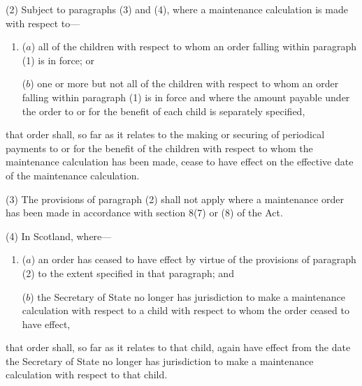 \documentclass[12pt,a4paper]{article}
\begin{document}
(2) Subject to paragraphs (3) and (4), where a maintenance 
calculation
is made with respect to—
\begin{enumerate}\item[]
($a$) all of the children with respect to whom an order falling within paragraph (1) is in force; or

($b$) one or more but not all of the children with respect to whom an order falling within paragraph (1) is in force and where the amount payable under the order to or for the benefit of each child is separately specified,
\end{enumerate}
that order shall, so far as it relates to the making or securing of periodical payments to or for the benefit of the children with respect to whom the maintenance 
calculation 
has been made, cease to have effect
on the effective date of the maintenance calculation.  %

(3) The provisions of paragraph (2) shall not apply where a maintenance order has been made in accordance with section 8(7) or (8) of the Act.

(4) In Scotland, where—
\begin{enumerate}\item[]
($a$) an order has ceased to have effect by virtue of the provisions of paragraph (2) to the extent specified in that paragraph; and

($b$) 
the Secretary of State  %
no longer has jurisdiction to make a maintenance 
calculation
with respect to a child with respect to whom the order ceased to have effect,
\end{enumerate}
that order shall, so far as it relates to that child, again have effect from the date 
the Secretary of State  %
no longer has jurisdiction to make a maintenance 
calculation
with respect to that child.
\end{document}
